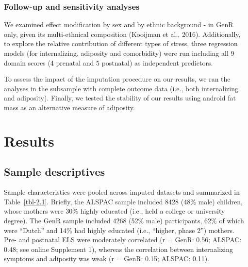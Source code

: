 \documentclass[
  letterpaper,
  DIV=11,
  numbers=noendperiod]{scrreport}
\begin{document}
\subsubsection{Follow-up and sensitivity
analyses}\label{follow-up-and-sensitivity-analyses}

We examined effect modification by sex and by ethnic background - in
GenR only, given its multi-ethnical composition (Kooijman et al., 2016).
Additionally, to explore the relative contribution of different types of
stress, three regression models (for internalizing, adiposity and
comorbidity) were run including all 9 domain scores (4 prenatal and 5
postnatal) as independent predictors.

To assess the impact of the imputation procedure on our results, we ran
the analyses in the subsample with complete outcome data (i.e., both
internalizing and adiposity). Finally, we tested the stability of our
results using android fat mass as an alternative measure of adiposity.

\section{Results}\label{results}

\subsection{Sample descriptives}\label{sample-descriptives}

Sample characteristics were pooled across imputed datasets and
summarized in Table~\ref{tbl-2.1}. Briefly, the ALSPAC sample included
8428 (48\% male) children, whose mothers were 30\% highly educated
(i.e., held a college or university degree). The GenR sample included
4268 (52\% male) participants, 62\% of which were ``Dutch'' and 14\% had
highly educated (i.e., ``higher, phase 2'') mothers. Pre- and postnatal
ELS were moderately correlated (r = GenR: 0.56; ALSPAC: 0.48; see online
Supplement 1), whereas the correlation between internalizing symptoms
and adiposity was weak (r = GenR: 0.15; ALSPAC: 0.11).
\end{document}
